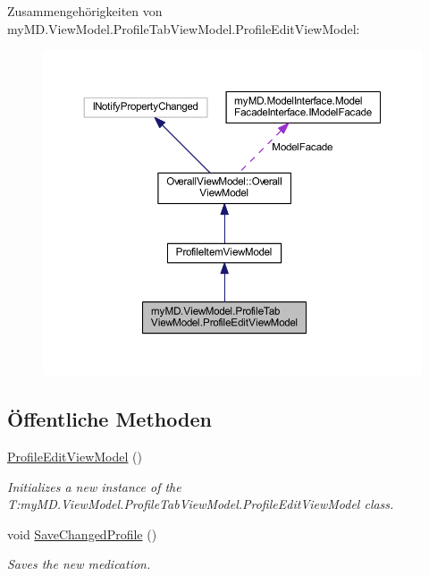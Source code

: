 Zusammengehörigkeiten von my\+M\+D.\+View\+Model.\+Profile\+Tab\+View\+Model.\+Profile\+Edit\+View\+Model\+:
\nopagebreak
\begin{figure}[H]
\begin{center}
\leavevmode
\includegraphics[width=350pt]{classmy_m_d_1_1_view_model_1_1_profile_tab_view_model_1_1_profile_edit_view_model__coll__graph}
\end{center}
\end{figure}
\subsection*{Öffentliche Methoden}
\begin{DoxyCompactItemize}
\item 
\mbox{\hyperlink{classmy_m_d_1_1_view_model_1_1_profile_tab_view_model_1_1_profile_edit_view_model_a92ac6c760b9ffc99eb62a3eeb754d1bf}{Profile\+Edit\+View\+Model}} ()
\begin{DoxyCompactList}\small\item\em Initializes a new instance of the T\+:my\+M\+D.\+View\+Model.\+Profile\+Tab\+View\+Model.\+Profile\+Edit\+View\+Model class. \end{DoxyCompactList}\item 
void \mbox{\hyperlink{classmy_m_d_1_1_view_model_1_1_profile_tab_view_model_1_1_profile_edit_view_model_a1ebfb3a905248cbf7e96a566dc7a4e9c}{Save\+Changed\+Profile}} ()
\begin{DoxyCompactList}\small\item\em Saves the new medication. \end{DoxyCompactList}\end{DoxyCompactItemize}
